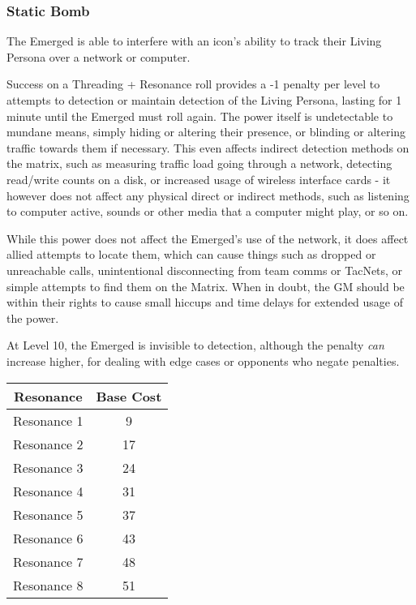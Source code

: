 \begin{multicols*}{3}
	\subsubsection*{Static Bomb}\label{static_bomb}
	
	The Emerged is able to interfere with an icon's ability to track their Living Persona over a network or computer.
	
	Success on a Threading + Resonance roll provides a -1 penalty per level to attempts to detection or maintain detection of the Living Persona, lasting for 1 minute until the Emerged must roll again. The power itself is undetectable to mundane means, simply hiding or altering their presence, or blinding or altering traffic towards them if necessary. This even affects indirect detection methods on the matrix, such as measuring traffic load going through a network, detecting read/write counts on a disk, or increased usage of wireless interface cards - it however does not affect any physical direct or indirect methods, such as listening to computer active, sounds or other media that a computer might play, or so on.
	
	While this power does not affect the Emerged's use of the network, it does affect allied attempts to locate them, which can cause things such as dropped or unreachable calls, unintentional disconnecting from team comms or TacNets, or simple attempts to find them on the Matrix. When in doubt, the GM should be within their rights to cause small hiccups and time delays for extended usage of the power.
	
	At Level 10, the Emerged is invisible to detection, although the penalty \textit{can} increase higher, for dealing with edge cases or opponents who negate penalties.
	
	\begin{center}
		\begin{tabular}{|c|c|}
			\hline
			Resonance & Base Cost\\
			\hline
			\hline
			Resonance 1 & 9 \\
			Resonance 2 & 17 \\
			Resonance 3 & 24 \\
			Resonance 4 & 31 \\
			Resonance 5 & 37 \\
			Resonance 6 & 43 \\
			Resonance 7 & 48 \\
			Resonance 8 & 51 \\
			\hline
		\end{tabular}
	\end{center}	
	

\end{multicols*}
